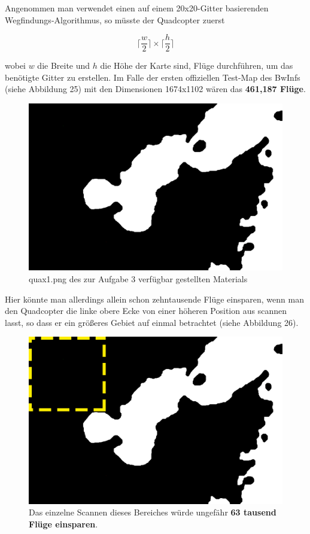 \documentclass[a4paper,12pt]{article}
\begin{document}
Angenommen man verwendet einen auf einem 20x20-Gitter basierenden Wegfindungs-Algorithmus, so müsste der Quadcopter zuerst
\begin{center}
\begin{Large}
\[\lceil \frac{w}{2}\rceil \times \lceil \frac{h}{2}\rceil\]
\end{Large}
\end{center}
wobei $w$ die Breite und $h$ die Höhe der Karte sind, Flüge durchführen, um das benötigte Gitter zu erstellen.
Im Falle der ersten offiziellen Test-Map des BwInfs (siehe Abbildung 25) mit den Dimensionen 1674x1102 wären das \textbf{461,187 Flüge}.
\begin{figure}[H]
\centering
    \includegraphics[width=0.8\linewidth]{Bilder/Aufgabe3/Maps/quax1.png}
    \caption{quax1.png des zur Aufgabe 3 verfügbar gestellten Materials}
\end{figure}
Hier könnte man allerdings allein schon zehntausende Flüge einsparen, wenn man den Quadcopter die linke obere Ecke von einer höheren Position aus scannen lasst, so dass er ein größeres Gebiet auf einmal betrachtet (siehe Abbildung 26).
\begin{figure}[H]
\centering
    \includegraphics[width=0.8\linewidth]{Bilder/Aufgabe3/Einsparung_Fluege.png}
    \caption{Das einzelne Scannen dieses Bereiches würde ungefähr \textbf{63 tausend Flüge einsparen}.}
\end{figure}
\end{document}
